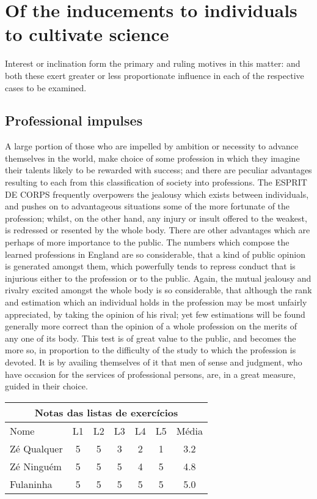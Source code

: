 \documentclass{aa}
\begin{document}
\section{Of the inducements to individuals to cultivate science}

Interest or inclination form the primary and ruling motives in this
matter: and both these exert greater or less proportionate influence in
each of the respective cases to be examined.

\subsection{Professional impulses}

A large portion of those who are impelled by ambition or necessity to
advance themselves in the world, make choice of some profession in which
they imagine their talents likely to be rewarded with success; and there
are peculiar advantages resulting to each from this classification of
society into professions. The ESPRIT DE CORPS frequently overpowers the
jealousy which exists between individuals, and pushes on to advantageous
situations some of the more fortunate of the profession; whilst, on the
other hand, any injury or insult offered to the weakest, is redressed or
resented by the whole body. There are other advantages which are perhaps
of more importance to the public. The numbers which compose the learned
professions in England are so considerable, that a kind of public
opinion is generated amongst them, which powerfully tends to repress
conduct that is injurious either to the profession or to the public.
Again, the mutual jealousy and rivalry excited amongst the whole body
is so considerable, that although the rank and estimation which an
individual holds in the profession may be most unfairly appreciated,
by taking the opinion of his rival; yet few estimations will be found
generally more correct than the opinion of a whole profession on the
merits of any one of its body. This test is of great value to the
public, and becomes the more so, in proportion to the difficulty of the
study to which the profession is devoted. It is by availing themselves
of it that men of sense and judgment, who have occasion for the services
of professional persons, are, in a great measure, guided in their
choice.

\begin{tabular}[t]{|l|ccccc|c|}
    \multicolumn{7}{c}{Notas das listas de exercícios} \\
    \hline
    Nome & L1 & L2 & L3 & L4 & L5 & Média \\
    \hline
    Zé Qualquer & 5 & 5 & 3 & 2 & 1 & 3.2 \\
    Zé Ninguém  & 5 & 5 & 5 & 4 & 5 & 4.8 \\
    Fulaninha   & 5 & 5 & 5 & 5 & 5 & 5.0\\
    \hline
\end{tabular}
\end{document}
